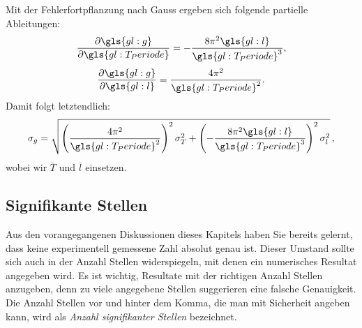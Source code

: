 Mit der Fehlerfortpflanzung nach Gauss ergeben sich folgende partielle Ableitungen:
\begin{align}
\frac{\partial \gls{gl:g}}{\partial \gls{gl:T_Periode}} = - \frac{8 \pi^2 \gls{gl:l}}{\gls{gl:T_Periode}^3},
\end{align}
\begin{align}
\frac{\partial \gls{gl:g}}{\partial \gls{gl:l}}  =   \frac{4 \pi^2}{\gls{gl:T_Periode}^2}.
\label{eq:vl3-7}
\end{align}
Damit folgt letztendlich:
\begin{align}
\sigma_g = \sqrt{ \left( \frac{4 \pi^2}{\gls{gl:T_Periode}^2} \right)^2 \sigma^2_T + \left( - \frac{8 \pi^2 \gls{gl:l}}{\gls{gl:T_Periode}^3} \right)^2 \sigma^2_l }\,,
\label{eq:vl3-8}
\end{align}
wobei wir $\overline{T}$ und $\overline{l}$ einsetzen.



\subsection{Signifikante Stellen}
Aus den vorangegangenen Diskussionen dieses Kapitels haben Sie bereits gelernt, dass keine experimentell gemessene Zahl absolut genau ist. Dieser Umstand sollte sich auch in der Anzahl Stellen widerspiegeln, mit denen ein numerisches Resultat angegeben wird. Es ist wichtig, Resultate mit der richtigen Anzahl Stellen anzugeben, denn zu viele angegebene Stellen suggerieren eine falsche Genauigkeit. Die Anzahl Stellen vor und hinter dem Komma, die man mit Sicherheit angeben kann, wird als \textit{Anzahl signifikanter Stellen} bezeichnet. \\

